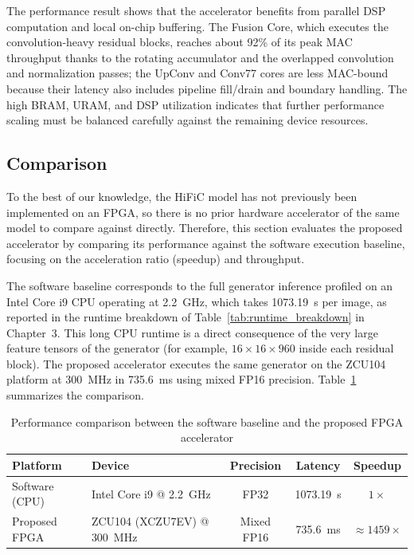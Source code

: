The performance result shows that the accelerator benefits from parallel DSP computation and local on-chip buffering. The Fusion Core, which executes the convolution-heavy residual blocks, reaches about 92\% of its peak MAC throughput thanks to the rotating accumulator and the overlapped convolution and normalization passes; the UpConv and Conv77 cores are less MAC-bound because their latency also includes pipeline fill/drain and boundary handling. The high BRAM, URAM, and DSP utilization indicates that further performance scaling must be balanced carefully against the remaining device resources.

\subsection{Comparison}

To the best of our knowledge, the HiFiC model has not previously been implemented on an FPGA, so there is no prior hardware accelerator of the same model to compare against directly. Therefore, this section evaluates the proposed accelerator by comparing its performance against the software execution baseline, focusing on the acceleration ratio (speedup) and throughput.

The software baseline corresponds to the full generator inference profiled on an Intel Core i9 CPU operating at 2.2~GHz, which takes 1073.19~s per image, as reported in the runtime breakdown of Table~\ref{tab:runtime_breakdown} in Chapter~3. This long CPU runtime is a direct consequence of the very large feature tensors of the generator (for example, $16\times16\times960$ inside each residual block). The proposed accelerator executes the same generator on the ZCU104 platform at 300~MHz in 735.6~ms using mixed FP16 precision. Table~\ref{tab:performance_comparison} summarizes the comparison.

\begin{table}[H]
    \centering
    \caption{Performance comparison between the software baseline and the proposed FPGA accelerator}
    \label{tab:performance_comparison}
    \begin{tabular}{|>{\raggedright\arraybackslash}p{2.6cm}|>{\raggedright\arraybackslash}p{3.6cm}|c|c|c|}
        \hline
        \textbf{Platform} & \textbf{Device} & \textbf{Precision} & \textbf{Latency} & \textbf{Speedup} \\
        \hline
        Software (CPU) & Intel Core i9 @ 2.2~GHz & FP32 & 1073.19~s & $1\times$ \\
        \hline
        Proposed FPGA & ZCU104 (XCZU7EV) @ 300~MHz & Mixed FP16 & 735.6~ms & $\approx 1459\times$ \\
        \hline
    \end{tabular}
\end{table}


